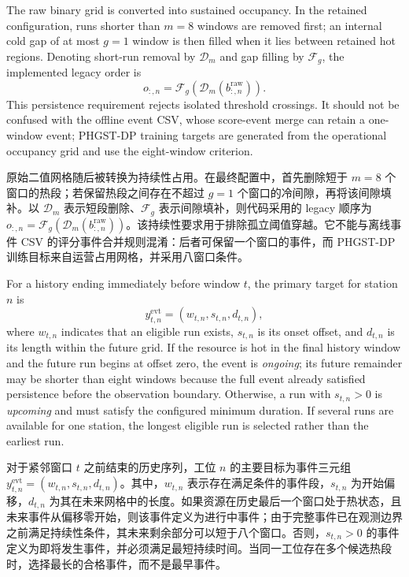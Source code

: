 \documentclass[a4paper,fleqn]{cas-dc}
\newcommand{\zhpara}[1]{%
  \par\begingroup\small\color{black!72}\noindent #1\par\endgroup}
\begin{document}
The raw binary grid is converted into sustained occupancy. In the retained configuration, runs shorter than $m=8$ windows are removed first; an internal cold gap of at most $g=1$ window is then filled when it lies between retained hot regions. Denoting short-run removal by $\mathcal{D}_{m}$ and gap filling by $\mathcal{F}_{g}$, the implemented legacy order is
\begin{equation}
o_{:,n}=\mathcal{F}_{g}\!\left(\mathcal{D}_{m}
\left(b^{\mathrm{raw}}_{:,n}\right)\right).
\end{equation}
This persistence requirement rejects isolated threshold crossings. It should not be confused with the offline event CSV, whose score-event merge can retain a one-window event; PHGST-DP training targets are generated from the operational occupancy grid and use the eight-window criterion.

\zhpara{原始二值网格随后被转换为持续性占用。在最终配置中，首先删除短于 $m=8$ 个窗口的热段；若保留热段之间存在不超过 $g=1$ 个窗口的冷间隙，再将该间隙填补。以 $\mathcal{D}_m$ 表示短段删除、$\mathcal{F}_g$ 表示间隙填补，则代码采用的 legacy 顺序为 $o_{:,n}=\mathcal{F}_{g}(\mathcal{D}_{m}(b^{\mathrm{raw}}_{:,n}))$。该持续性要求用于排除孤立阈值穿越。它不能与离线事件 CSV 的评分事件合并规则混淆：后者可保留一个窗口的事件，而 PHGST-DP 训练目标来自运营占用网格，并采用八窗口条件。}

For a history ending immediately before window $t$, the primary target for station $n$ is
\begin{equation}
y_{t,n}^{\mathrm{evt}}=(w_{t,n},s_{t,n},d_{t,n}),
\end{equation}
where $w_{t,n}$ indicates that an eligible run exists, $s_{t,n}$ is its onset offset, and $d_{t,n}$ is its length within the future grid. If the resource is hot in the final history window and the future run begins at offset zero, the event is \emph{ongoing}; its future remainder may be shorter than eight windows because the full event already satisfied persistence before the observation boundary. Otherwise, a run with $s_{t,n}>0$ is \emph{upcoming} and must satisfy the configured minimum duration. If several runs are available for one station, the longest eligible run is selected rather than the earliest run.

\zhpara{对于紧邻窗口 $t$ 之前结束的历史序列，工位 $n$ 的主要目标为事件三元组 $y_{t,n}^{\mathrm{evt}}=(w_{t,n},s_{t,n},d_{t,n})$。其中，$w_{t,n}$ 表示存在满足条件的事件段，$s_{t,n}$ 为开始偏移，$d_{t,n}$ 为其在未来网格中的长度。如果资源在历史最后一个窗口处于热状态，且未来事件从偏移零开始，则该事件定义为进行中事件；由于完整事件已在观测边界之前满足持续性条件，其未来剩余部分可以短于八个窗口。否则，$s_{t,n}>0$ 的事件定义为即将发生事件，并必须满足最短持续时间。当同一工位存在多个候选热段时，选择最长的合格事件，而不是最早事件。}
\end{document}
